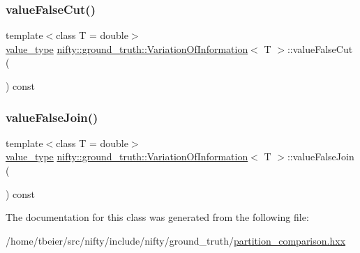 \mbox{\label{classnifty_1_1ground__truth_1_1VariationOfInformation_a4a46e97abc7c487a2459e06c27349596}} 
\subsubsection{\texorpdfstring{value\+False\+Cut()}{valueFalseCut()}}
{\footnotesize\ttfamily template$<$class T  = double$>$ \\
\hyperlink{classnifty_1_1ground__truth_1_1VariationOfInformation_ad0f4a205d57087c7641664b76410e40c}{value\+\_\+type} \hyperlink{classnifty_1_1ground__truth_1_1VariationOfInformation}{nifty\+::ground\+\_\+truth\+::\+Variation\+Of\+Information}$<$ T $>$\+::value\+False\+Cut (\begin{DoxyParamCaption}{ }\end{DoxyParamCaption}) const\hspace{0.3cm}{\ttfamily [inline]}}

\mbox{\label{classnifty_1_1ground__truth_1_1VariationOfInformation_a2e8e4911485c710468708adfcc5c67e9}} 
\subsubsection{\texorpdfstring{value\+False\+Join()}{valueFalseJoin()}}
{\footnotesize\ttfamily template$<$class T  = double$>$ \\
\hyperlink{classnifty_1_1ground__truth_1_1VariationOfInformation_ad0f4a205d57087c7641664b76410e40c}{value\+\_\+type} \hyperlink{classnifty_1_1ground__truth_1_1VariationOfInformation}{nifty\+::ground\+\_\+truth\+::\+Variation\+Of\+Information}$<$ T $>$\+::value\+False\+Join (\begin{DoxyParamCaption}{ }\end{DoxyParamCaption}) const\hspace{0.3cm}{\ttfamily [inline]}}



The documentation for this class was generated from the following file\+:\begin{DoxyCompactItemize}
\item 
/home/tbeier/src/nifty/include/nifty/ground\+\_\+truth/\hyperlink{partition__comparison_8hxx}{partition\+\_\+comparison.\+hxx}\end{DoxyCompactItemize}
